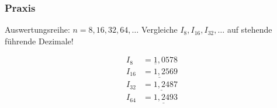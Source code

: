 \subsubsection{Praxis}

Auswertungsreihe: \( n=8, 16, 32, 64, \ldots \) \newline
Vergleiche \( I_8,I_{16}, I_{32}, \ldots\) auf stehende führende Dezimale!

\begin{align*}
	I_8 &= \underline{1},0578 \\
	I_{16} &= \underline{1,2}569 \\
	I_{32} &= \underline{1,24}87 \\
	I_{64} &= \underline{1,249}3 \\
\end{align*}





